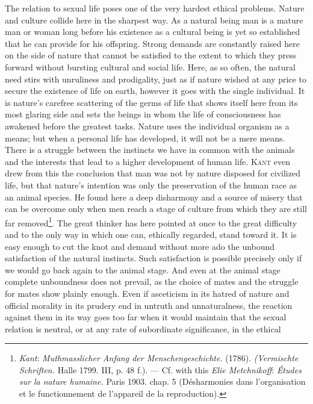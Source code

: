 \documentclass[12pt,a4paper,openany]{book}
\newcommand{\opage}[1]{\marginnote{\footnotesize\textit{[#1]}}}
\begin{document}
The relation to sexual life poses one of the very hardest ethical problems. Nature and culture collide here in the
sharpest way. As a natural being man is a mature man or woman long before his existence as a cultural being is yet
so established that he can provide for his offspring. Strong demands are constantly raised here on the side of
nature that cannot be satisfied to the extent to which they press forward without bursting cultural and social life.
Here, as so often, the natural need stirs with unruliness and prodigality, just as if nature wished at any price to
secure the existence of life on earth, however it goes with the single individual. It is nature's carefree
scattering of the germs of life that shows itself here from its most glaring side and sets the beings in whom the
life of consciousness has awakened before the greatest tasks. Nature uses the individual organism as a means; but
when a personal life has developed, it will not be a mere means. There is a struggle between the instincts we have
in common with the animals and the interests that lead to a higher development of human life. \textsc{Kant} even
drew from this the conclusion that man was not by nature disposed for civilized life, but that nature's intention
was only the preservation of the human race as an animal species. He found here a deep disharmony and a source of
misery
\opage{227}that can be overcome only when men reach a stage of culture from which they are still far
removed\footnote[1]{\emph{Kant}: \textit{Muthmasslicher Anfang der Menschengeschichte.} (1786). \textit{(Vermischte
Schriften.} Halle 1799. III, p. 48 f.). --- Cf. with this \emph{Elie Metchnikoff}: \textit{Études sur la nature humaine.} Paris 1903. chap. 5 (Désharmonies dans l'organisation et le functionnement de l'appareil de la
reproduction).}. The great thinker has here pointed at once to the great difficulty and to the only way in which
one can, ethically regarded, stand toward it. It is easy enough to cut the knot and demand without more ado the
unbound satisfaction of the natural instincts. Such satisfaction is possible precisely only if we would go back
again to the animal stage. And even at the animal stage complete unboundness does not prevail, as the choice of
mates and the struggle for mates show plainly enough. Even if asceticism in its hatred of nature and official
morality in its prudery end in untruth and unnaturalness, the reaction against them in its way goes too far when it
would maintain that the sexual relation is neutral, or at any rate of subordinate significance, in the ethical
\end{document}
